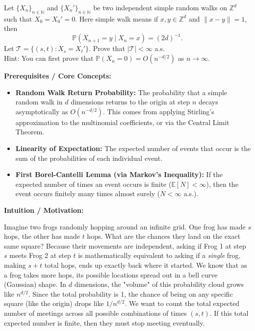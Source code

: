 \begin{exercise}\label{probability:2017:8}
Let $\{X_n\}_{n \in \mathbb{N}}$ and $\{X_n'\}_{n \in \mathbb{N}}$ be two independent simple random walks on $\mathbb{Z}^d$ such that $X_0 = X_0' = 0$. Here simple walk means if $x, y \in \mathbb{Z}^d$ and $\|x - y\| = 1$, then
\[
\mathbb{P}(X_{n+1} = y \mid X_n = x) = (2d)^{-1}.
\]
Let $\mathcal{T} = \{ (s, t) : X_s = X_t' \}$. Prove that $|\mathcal{T}| < \infty$ a.s. \\
Hint: You can first prove that $\mathbb{P}(X_n = 0) = O(n^{-d/2})$ as $n \to \infty$.
\end{exercise}

\begin{solution}
\textbf{Prerequisites / Core Concepts:}
\begin{itemize}
    \item \textbf{Random Walk Return Probability:} The probability that a simple random walk in $d$ dimensions returns to the origin at step $n$ decays asymptotically as $O(n^{-d/2})$. This comes from applying Stirling's approximation to the multinomial coefficients, or via the Central Limit Theorem.
    \item \textbf{Linearity of Expectation:} The expected number of events that occur is the sum of the probabilities of each individual event.
    \item \textbf{First Borel-Cantelli Lemma (via Markov's Inequality):} If the expected number of times an event occurs is finite ($\mathbb{E}[N] < \infty$), then the event occurs finitely many times almost surely ($N < \infty$ a.s.).
\end{itemize}

\textbf{Intuition / Motivation:}

Imagine two frogs randomly hopping around an infinite grid. One frog has made $s$ hops, the other has made $t$ hops. What are the chances they land on the exact same square?
Because their movements are independent, asking if Frog 1 at step $s$ meets Frog 2 at step $t$ is mathematically equivalent to asking if a \textit{single} frog, making $s+t$ total hops, ends up exactly back where it started. 
We know that as a frog takes more hops, its possible locations spread out in a bell curve (Gaussian) shape. In $d$ dimensions, the "volume" of this probability cloud grows like $n^{d/2}$. Since the total probability is 1, the chance of being on any specific square (like the origin) drops like $1/n^{d/2}$.
We want to count the total expected number of meetings across all possible combinations of times $(s, t)$. If this total expected number is finite, then they must stop meeting eventually.


\end{solution}
